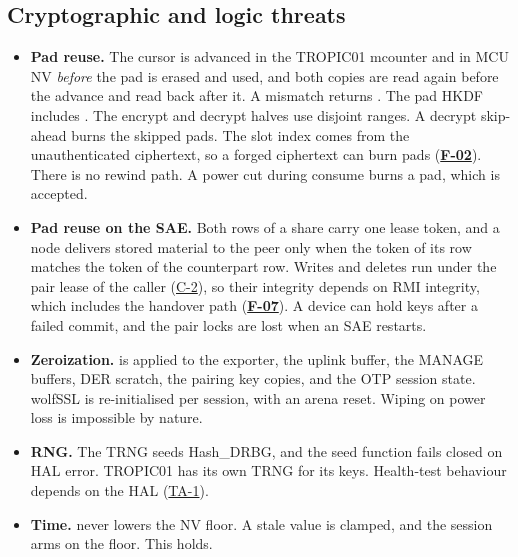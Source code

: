 \documentclass[11pt,a4paper]{article}
\newcommand{\fid}[1]{\textbf{#1}}
\begin{document}
\subsection{Cryptographic and logic threats}
\begin{itemize}
\item \textbf{Pad reuse.} The cursor is advanced in the TROPIC01 mcounter and in MCU NV \emph{before} the pad is erased and used, and both copies are read again before the advance and read back after it. A mismatch returns . The pad HKDF includes . The encrypt and decrypt halves use disjoint ranges. A decrypt skip-ahead burns the skipped pads. The slot index comes from the unauthenticated ciphertext, so a forged ciphertext can burn pads (\hyperref[f:F-02]{\fid{F-02}}). There is no rewind path. A power cut during consume burns a pad, which is accepted.
\item \textbf{Pad reuse on the SAE.} Both rows of a share carry one lease token, and a node delivers stored material to the peer only when the token of its row matches the token of the counterpart row. Writes and deletes run under the pair lease of the caller (\hyperref[c:C-2]{C-2}), so their integrity depends on RMI integrity, which includes the handover path (\hyperref[f:F-07]{\fid{F-07}}). A device can hold keys after a failed commit, and the pair locks are lost when an SAE restarts.
\item \textbf{Zeroization.}  is applied to the exporter, the uplink buffer, the MANAGE buffers, DER scratch, the pairing key copies, and the OTP session state. wolfSSL is re-initialised per session, with an arena reset. Wiping on power loss is impossible by nature.
\item \textbf{RNG.} The TRNG seeds Hash\_DRBG, and the seed function fails closed on HAL error. TROPIC01 has its own TRNG for its keys. Health-test behaviour depends on the HAL (\hyperref[ta:TA-1]{TA-1}).
\item \textbf{Time.}  never lowers the NV floor. A stale value is clamped, and the session arms on the floor. This holds.
\end{itemize}
\end{document}

